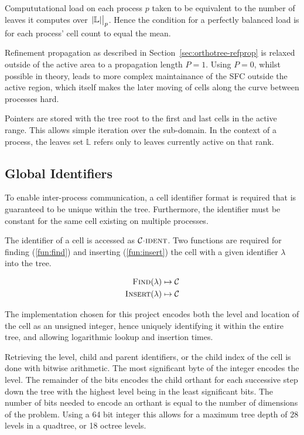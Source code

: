 \documentclass[twoside]{IIBproject}
\newcommand{\acc}{{\mkern 0.5mu\cdot\mkern 0.5mu}}
\numberwithin{figure}{section}
\begin{document}
        Compututational load on each process $p$ taken to be equivalent to the number of leaves it computes over $\eval{\abs{\mathbb{L}}}_p$. Hence the condition for a perfectly balanced load is for each process' cell count to equal the mean.

        Refinement propagation as described in Section~\ref{sec:orthotree-refprop} is relaxed outside of the active area to a propagation length $P=1$. Using $P=0$, whilst possible in theory, leads to more complex maintainance of the SFC outside the active region, which itself makes the later moving of cells along the curve between processes hard. 

        Pointers are stored with the tree root to the first and last cells in the active range. This allows simple iteration over the sub-domain. In the context of a process, the leaves set $\mathbb{L}$ refers only to leaves currently active on that rank.



    \subsection{Global Identifiers} %
        \label{sec:globalid}

        To enable inter-process communication, a cell identifier format is required that is guaranteed to be unique within the tree. Furthermore, the identifier must be constant for the same cell existing on multiple processes.

        The identifier of a cell is accessed as $\mathcal{C}\acc\textproc{ident}$. Two functions are required for finding (\ref{fun:find}) and inserting (\ref{fun:insert}) the cell with a given identifier $\lambda$ into the tree.

        \begin{align}
            \label{fun:find}
            \textproc{Find}(\lambda) \mapsto \mathcal{C} \\
            \label{fun:insert}
            \textproc{Insert}(\lambda) \mapsto \mathcal{C}
        \end{align}

        The implementation chosen for this project encodes both the level and location of the cell as an unsigned integer, hence uniquely identifying it within the entire tree, and allowing logarithmic lookup and insertion times.

        Retrieving the level, child and parent identifiers, or the child index of the cell is done with bitwise arithmetic. The most significant byte of the integer encodes the level. The remainder of the bits encodes the child orthant for each successive step down the tree with the highest level being in the least significant bits. The number of bits needed to encode an orthant is equal to the number of dimensions of the problem. Using a 64 bit integer this allows for a maximum tree depth of 28 levels in a quadtree, or 18 octree levels.
\end{document}
